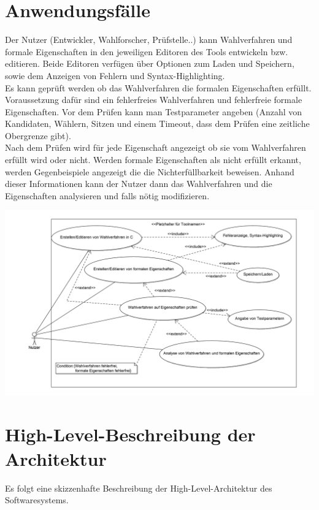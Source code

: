 \documentclass[a4paper]{scrreprt}
\begin{document}
\section{Anwendungsfälle}
Der Nutzer (Entwickler, Wahlforscher, Prüfstelle..) kann Wahlverfahren und formale Eigenschaften in den jeweiligen Editoren des Tools entwickeln bzw. editieren.
Beide Editoren verfügen über Optionen zum Laden und Speichern, sowie dem Anzeigen von Fehlern und Syntax-Highlighting.\\
Es kann geprüft werden ob das Wahlverfahren die formalen Eigenschaften erfüllt. Voraussetzung dafür sind ein fehlerfreies Wahlverfahren und fehlerfreie formale Eigenschaften. Vor dem Prüfen kann man Testparameter angeben (Anzahl von Kandidaten, Wählern, Sitzen und einem Timeout, dass dem Prüfen eine zeitliche Obergrenze gibt).\\
Nach dem Prüfen wird für jede Eigenschaft angezeigt ob sie vom Wahlverfahren erfüllt wird oder nicht. Werden formale Eigenschaften als nicht erfüllt erkannt, werden Gegenbeispiele angezeigt die die Nichterfüllbarkeit beweisen. Anhand dieser Informationen kann der Nutzer dann das Wahlverfahren und die Eigenschaften analysieren und falls nötig modifizieren.

\hspace{-2cm}\includegraphics[scale=0.09]{UseCaseDiagram.png}

\section{High-Level-Beschreibung der Architektur}	
Es folgt eine skizzenhafte Beschreibung der High-Level-Architektur des Softwaresystems. 
\end{document}

